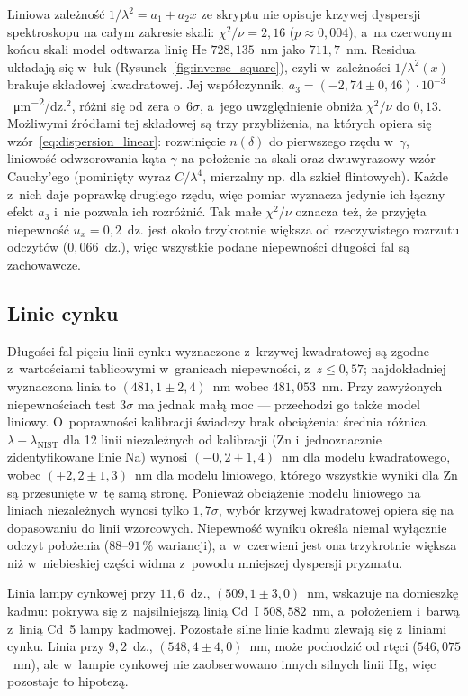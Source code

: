 \documentclass[12pt, a4paper]{article}
\begin{document}
Liniowa zależność $1/\lambda^2 = a_1 + a_2x$ ze skryptu nie opisuje krzywej dyspersji
spektroskopu na całym zakresie skali: $\chi^2/\nu = 2{,}16$ ($p \approx 0{,}004$),
a~na czerwonym końcu skali model odtwarza linię He $728{,}135$~nm jako $711{,}7$~nm.
Residua układają się w~łuk (Rysunek~\ref{fig:inverse_square}), czyli w~zależności
$1/\lambda^2(x)$ brakuje składowej kwadratowej. Jej współczynnik,
$a_3 = (-2{,}74 \pm 0{,}46)\cdot 10^{-3}$~\si{\micro\meter^{-2}}/dz.$^2$, różni się od zera
o~$6\sigma$, a~jego uwzględnienie obniża $\chi^2/\nu$ do $0{,}13$. Możliwymi źródłami tej
składowej są trzy przybliżenia, na których opiera się wzór~\eqref{eq:dispersion_linear}:
rozwinięcie $n(\delta)$ do pierwszego rzędu w~$\gamma$, liniowość odwzorowania kąta $\gamma$
na położenie na skali oraz dwuwyrazowy wzór Cauchy'ego (pominięty wyraz $C/\lambda^4$,
mierzalny np. dla szkieł flintowych). Każde z~nich daje poprawkę drugiego rzędu, więc
pomiar wyznacza jedynie ich łączny efekt $a_3$ i~nie pozwala ich rozróżnić.
Tak małe $\chi^2/\nu$ oznacza też, że przyjęta niepewność $u_x = 0{,}2$~dz. jest około
trzykrotnie większa od rzeczywistego rozrzutu odczytów ($0{,}066$~dz.), więc wszystkie
podane niepewności długości fal są zachowawcze.

\subsection{Linie cynku}

Długości fal pięciu linii cynku wyznaczone z~krzywej kwadratowej są zgodne z~wartościami
tablicowymi w~granicach niepewności, z~$z \leq 0{,}57$; najdokładniej wyznaczona linia
to $(481{,}1 \pm 2{,}4)$~nm wobec $481{,}053$~nm. Przy zawyżonych niepewnościach test
$3\sigma$ ma jednak małą moc --- przechodzi go także model liniowy. O~poprawności kalibracji
świadczy brak obciążenia: średnia różnica $\lambda - \lambda_\text{NIST}$ dla 12 linii
niezależnych od kalibracji (Zn i~jednoznacznie zidentyfikowane linie Na) wynosi
$(-0{,}2 \pm 1{,}4)$~nm dla modelu kwadratowego, wobec $(+2{,}2 \pm 1{,}3)$~nm dla modelu
liniowego, którego wszystkie wyniki dla Zn są przesunięte w~tę samą stronę. Ponieważ
obciążenie modelu liniowego na liniach niezależnych wynosi tylko $1{,}7\sigma$, wybór krzywej
kwadratowej opiera się na dopasowaniu do linii wzorcowych. Niepewność wyniku określa
niemal wyłącznie odczyt położenia ($88$--$91\,\%$ wariancji), a~w~czerwieni jest ona
trzykrotnie większa niż w~niebieskiej części widma z~powodu mniejszej dyspersji pryzmatu.

Linia lampy cynkowej przy $11{,}6$~dz., $(509{,}1 \pm 3{,}0)$~nm, wskazuje na domieszkę
kadmu: pokrywa się z~najsilniejszą linią Cd~I $508{,}582$~nm, a~położeniem i~barwą
z~linią Cd~5 lampy kadmowej. Pozostałe silne linie kadmu zlewają się z~liniami cynku. Linia przy $9{,}2$~dz.,
$(548{,}4 \pm 4{,}0)$~nm, może pochodzić od rtęci ($546{,}075$~nm), ale w~lampie cynkowej
nie zaobserwowano innych silnych linii Hg, więc pozostaje to hipotezą.
\end{document}
